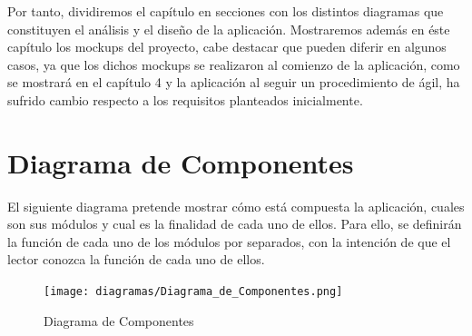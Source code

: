 \documentclass[11pt,openany]{book}
\begin{document}
Por tanto, dividiremos el capítulo en secciones con los distintos diagramas que constituyen el análisis y el diseño de la aplicación. Mostraremos además en éste capítulo los mockups del proyecto, cabe destacar que pueden diferir en algunos casos, ya que los dichos mockups se realizaron al comienzo de la aplicación, como se mostrará en el capítulo 4 y la aplicación al seguir un procedimiento de ágil, ha sufrido cambio respecto a los requisitos planteados inicialmente.
\pagebreak
\section{Diagrama de Componentes}
 
 El siguiente diagrama pretende mostrar cómo está compuesta la aplicación, cuales son sus módulos y cual es la finalidad de cada uno de ellos. Para ello, se definirán la función de cada uno de los módulos por separados, con la intención de que el lector conozca la función de cada uno de ellos.
 
\begin{figure}[H]
\centering
\texttt{[image: diagramas/Diagrama\_de\_Componentes.png]}
\caption{Diagrama de Componentes}
\end{figure}
\end{document}
